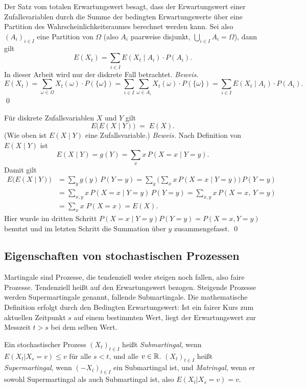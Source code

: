 \begin{satz}
Der Satz vom totalen Erwartungswert besagt, dass der Erwartungswert einer Zufallsvariablen
durch die Summe der bedingten Erwartungswerte über eine Partition des Wahrscheinlichkeitsraumes
berechnet werden kann. Sei also $(A_i)_{i \in I}$ eine Partition von $\Omega$ (also $A_i$ paarweise disjunkt, $\bigcup_{i \in I} A_i = \Omega$),
dann gilt $$E(X_t) = \sum_{i \in I} E(X_t \mid  A_i) \cdot P(A_i).$$
In dieser Arbeit wird nur der diskrete Fall betrachtet. \textit{Beweis.}
$$E(X_t) = \sum_{\omega \in \Omega} X_t(\omega) \cdot P(\{\omega\}) = \sum_{i \in I} \sum_{\omega \in A_i} X_t(\omega) \cdot P(\{\omega\}) = \sum_{i \in I} E(X_t \mid A_i) \cdot P(A_i).$$
\qed

\end{satz}

\begin{satz}
Für diskrete Zufallsvariablen $X$ und $Y$ gilt
$$
E\big(E(X\mid Y)\big)\;=\;E(X).
$$
(Wie oben ist $E(X\mid Y)$ eine Zufallsvariable.)
\textit{Beweis.} Nach Definition von $E(X\mid Y)$ ist $$E(X\mid Y)=g(Y) =\sum_x x\,P(X=x\mid Y=y).$$ Damit gilt
$$
\begin{aligned}
E\big(E(X\mid Y)\big)
&= \sum_y g(y)\,P(Y=y)
= \sum_y \Big(\sum_x x\,P(X=x\mid Y=y)\Big)\,P(Y=y)\\
&= \sum_{x,y} x\,P(X=x\mid Y=y)\,P(Y=y)
= \sum_{x,y} x\,P(X=x,\,Y=y)\\
&= \sum_x x\;P(X=x)
= E(X).
\end{aligned}
$$
Hier wurde im dritten Schritt $P(X=x\mid Y=y)P(Y=y)=P(X=x, Y=y)$ 
benutzt und im letzten Schritt die Summation über $y$ zusammengefasst. \qed

\end{satz}

\subsection{Eigenschaften von stochastischen Prozessen}

\begin{defi}[Martingal]
Martingale sind Prozesse, die tendenziell weder steigen noch fallen, 
also faire Prozesse. Tendenziell heißt auf den Erwartungswert bezogen. 
Steigende Prozesse werden Supermartingale genannt, fallende Submartingale. 
Die mathematische Definition erfolgt durch den Bedingten Erwartungswert: 
Ist ein fairer Kurs zum aktuellen Zeitpunkt $s$ auf einem bestimmten Wert, 
liegt der Erwartungswert zur Messzeit $t \gt s$ bei dem selben Wert.

Ein stochastischer Prozess $(X_t)_{t \in I}$ heißt \textit{Submartingal}, wenn 
$E(X_t|X_s=v) \le v$  für alle $s \lt t$, und alle $v \in \Bbb R$. $(X_t)_{t \in I}$
 heißt \textit{Supermartingal}, wenn  $(-X_t)_{t \in I}$ ein Submartingal ist, und \textit{Matringal}, 
 wenn er sowohl Supermartingal als auch Submartingal ist, also $E(X_t|X_s=v) = v$.
\end{defi}


